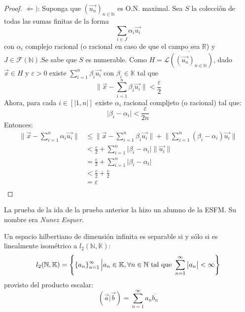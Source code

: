\documentclass[12pt]{report}
\newcounter{it}
\theoremstyle{largebreak}
\newcommand\abs[1]{\ensuremath{\big|#1\big|}}
\newcommand\norm[1]{\ensuremath{\|#1\|}}
\newcommand\pint[2]{\ensuremath{\left(#1\big| #2\right)}}
\newcommand\conj[1]{\ensuremath{\overline{#1}}}
\begin{document}
\begin{proof}
        $\Leftarrow)$: Suponga que $\left(\vec{u_n} \right)_{n\in\mathbb{N} }$ es O.N. maximal. Sea $S$ la colección de todas las sumas finitas de la forma 
        \begin{equation*}
            \sum_{ i\in J}\alpha_i\vec{u_i}
        \end{equation*}
        con $\alpha_i$ complejo racional (o racional en caso de que el campo sea $\mathbb{R}$) y $J\in\mathcal{F}(\mathbb{N})$.Se sabe que $S$ es numerable. Como $H=\overline{\mathcal{L}(\left(\vec{u_n} \right)_{n\in\mathbb{N} })}$, dado $\vec{x}\in H$ y $\varepsilon>0$ existe $\sum_{ i=1}^{n}\beta_i\vec{u_i}$ con $\beta_i\in\mathbb{K}$ tal que
        \begin{equation*}
            \norm{\vec{x}-\sum_{i=1 }^{n}\beta_i\vec{u_i}}<\frac{\varepsilon}{2}
        \end{equation*}
        Ahora, para cada $i\in\left[|1,n|\right]$ existe $\alpha_i$ racional compljeto (o racional) tal que:
        \begin{equation*}
            \abs{\beta_i-\alpha_i}<\frac{\varepsilon}{2n}
        \end{equation*}
        Entonces:
        \begin{equation*}
            \begin{split}
                \norm{\vec{x}-\sum_{i=1 }^{n}\alpha_i\vec{u_i}}&\leq\norm{\vec{x}-\sum_{i=1 }^{n}\beta_i\vec{u_i}}+\norm{\sum_{ i=1}^{n}(\beta_i-\alpha_i)\vec{u_i}}\\
                &<\frac{\varepsilon}{2}+\sum_{ i=1}^{n}\abs{\beta_i-\alpha_i}\norm{\vec{u_i}}\\
                &=\frac{\varepsilon}{2}+\sum_{ i=1}^{n}\abs{\beta_i-\alpha_i}\\
                &<\frac{\varepsilon}{2}+\frac{\varepsilon}{2} \\
                &=\varepsilon\\
            \end{split}
        \end{equation*}
    \end{proof}

    \begin{obs}
        La prueba de la ida de la prueba anterior la hizo un alumno de la ESFM. Su nombre era \textit{Nunez Esquer}.
    \end{obs}

    \begin{cor}
        Un espacio hilbertiano de dimensión infinita es separable si y sólo si es linealmente isométrico a $l_2(\mathbb{N},\mathbb{K})$:
        \begin{equation*}
            l_2(\mathbb{N},\mathbb{K})=\left\{\left\{a_n \right\}_{n=1 }^\infty\Big|a_n\in\mathbb{K},\forall n\in\mathbb{N}\textup{ tal que }\sum_{ n=1}^{\infty}\abs{a_n}<\infty \right\}
        \end{equation*}
        provisto del producto escalar:
        \begin{equation*}
            \pint{\vec{a}}{\vec{b}}=\sum_{ n=1}^{\infty}a_n\conj{b_n}
        \end{equation*}
    \end{cor}
\end{document}
